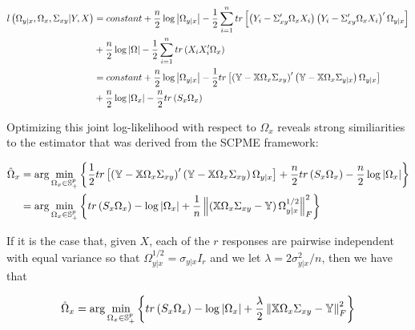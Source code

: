 \documentclass[11pt,]{report}
\theoremstyle{definition}
\theoremstyle{definition}
\theoremstyle{definition}
\theoremstyle{remark}
\begin{document}
\begin{equation}
\begin{split}
  l\left( \Omega_{y | x}, \Omega_{x}, \Sigma_{xy} | Y, X \right) &= constant + \frac{n}{2}\log\left| \Omega_{y | x} \right| - \frac{1}{2}\sum_{i = 1}^{n} tr\left[ \left( Y_{i} - \Sigma_{xy}'\Omega_{x} X_{i} \right)\left( Y_{i} - \Sigma_{xy}'\Omega_{x} X_{i} \right)'\Omega_{y | x} \right] \\
  &+\frac{n}{2}\log\left| \Omega \right| - \frac{1}{2}\sum_{i = 1}^{n}tr\left( X_{i}X_{i}'\Omega_{x} \right) \\
  &= constant + \frac{n}{2}\log\left| \Omega_{y | x} \right| - \frac{1}{2}tr\left[ \left( \mathbb{Y} - \mathbb{X}\Omega_{x}\Sigma_{xy} \right)'\left( \mathbb{Y} - \mathbb{X}\Omega_{x}\Sigma_{y | x} \right)\Omega_{y | x} \right] \\
  &+ \frac{n}{2}\log\left| \Omega_{x} \right| - \frac{n}{2}tr\left( S_{x}\Omega_{x} \right)
\label{eq:partialjointloglik}\notag
\end{split}
\end{equation}

Optimizing this joint log-likelihood with respect to \(\Omega_{x}\) reveals strong similiarities to the estimator that was derived from the SCPME framework:

\begin{equation}
\begin{split}
  \hat{\Omega}_{x} &= \arg\min_{\Omega_{x} \in \mathbb{S}_{+}^{p}}\left\{ \frac{1}{2}tr\left[ \left( \mathbb{Y} - \mathbb{X}\Omega_{x}\Sigma_{xy} \right)'\left( \mathbb{Y} - \mathbb{X}\Omega_{x}\Sigma_{xy} \right)\Omega_{y | x} \right] + \frac{n}{2}tr\left( S_{x}\Omega_{x} \right) - \frac{n}{2}\log\left| \Omega_{x} \right| \right\} \\
  &= \arg\min_{\Omega_{x} \in \mathbb{S}_{+}^{p}}\left\{ tr\left( S_{x}\Omega_{x} \right) - \log\left| \Omega_{x} \right| + \frac{1}{n}\left\| \left( \mathbb{X}\Omega_{x}\Sigma_{xy} - \mathbb{Y} \right)\Omega_{y | x}^{1/2} \right\|_{F}^{2} \right\}
\label{eq:omegajointloglik}\notag
\end{split}
\end{equation}

If it is the case that, given \(X\), each of the \(r\) responses are pairwise independent with equal variance so that \(\Omega_{y | x}^{1/2} = \sigma_{y | x}I_{r}\) and we let \(\lambda = 2\sigma_{y | x}^{2}/n\), then we have that

\begin{equation}
\hat{\Omega}_{x} = \arg\min_{\Omega_{x} \in \mathbb{S}_{+}^{p}}\left\{ tr\left( S_{x}\Omega_{x} \right) - \log\left| \Omega_{x} \right| + \frac{\lambda}{2}\left\| \mathbb{X}\Omega_{x}\Sigma_{xy} - \mathbb{Y} \right\|_{F}^{2} \right\}
\label{eq:omegajointmle}\notag
\end{equation}
\end{document}
